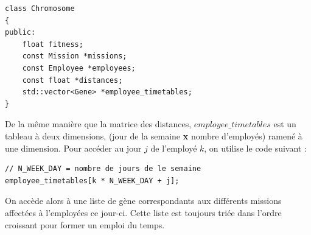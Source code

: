 \documentclass{article}
\begin{document}
\begin{itemize}
    \begin{lstlisting}
class Chromosome
{
public:
    float fitness;
    const Mission *missions;
    const Employee *employees;
    const float *distances;
    std::vector<Gene> *employee_timetables;
}
\end{lstlisting}
    De la même manière que la matrice des distances, $employee\_timetables$ est un tableau à deux dimensions, (jour de la semaine \textbf{x} nombre d'employés) ramené à une dimension. Pour accéder au jour $j$ de l'employé $k$, on utilise le code suivant :
\begin{lstlisting}
// N_WEEK_DAY = nombre de jours de le semaine
employee_timetables[k * N_WEEK_DAY + j];
\end{lstlisting}
    On accède alors à une liste de gène correspondants aux différents missions affectées à l'employées ce jour-ci. Cette liste est toujours triée dans l'ordre croissant pour former un emploi du temps.  
    \end{itemize}
    
\end{document}
